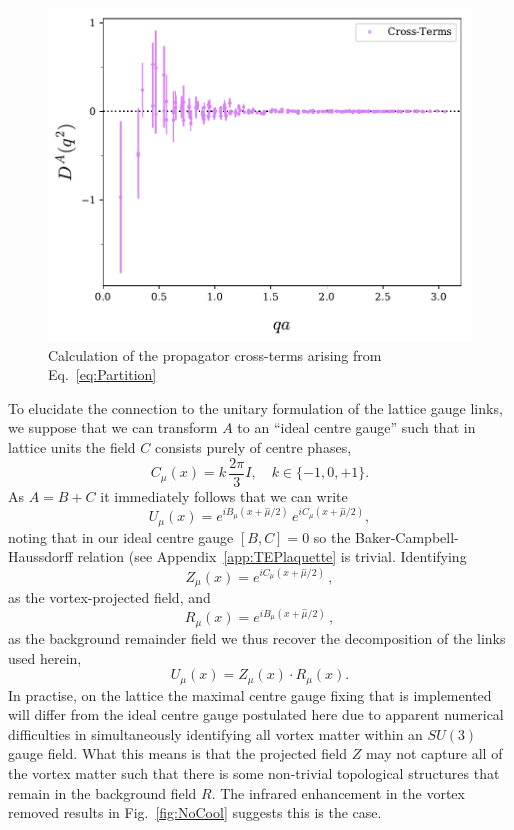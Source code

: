 \begin{figure}[htb!]
\centering
\includegraphics[width=\linewidth]{./ScalarGluComp_q2_CrossTerms.pdf}
\caption[Calculation of the propagator cross-terms]{\label{fig:CrossTerms} Calculation of the propagator cross-terms arising from Eq.~\eqref{eq:Partition}}
\end{figure} 
%

To elucidate the connection to the unitary formulation of the lattice gauge links, we suppose that we can transform $A$ to an ``ideal centre gauge'' such that in lattice units the field $C$ consists purely of centre phases,
%
\begin{equation}
C_\mu(x) = k\,\frac{2\pi}{3} I,\quad k\in \{-1,0,+1\}.
\end{equation}
%
As $A = B + C$ it immediately follows that we can write
\begin{equation}
U_{\mu}(x) = e^{i B_{\mu}(x+\hat{\mu}/2)} \, e^{i C_{\mu}(x+\hat{\mu}/2)},
\end{equation}
noting that in our ideal centre gauge $[B,C] = 0$ so the Baker-Campbell-Haussdorff relation (see Appendix~\ref{app:TEPlaquette} is trivial. Identifying
\begin{equation}
Z_{\mu}(x) = e^{i C_{\mu}(x+\hat{\mu}/2)}\, ,
\end{equation}
as the vortex-projected field, and
\begin{equation}
R_{\mu}(x) = e^{i B_{\mu}(x+\hat{\mu}/2)}\, ,
\end{equation}
as the background remainder field we thus recover the decomposition of the links used herein,
\begin{equation}
U_{\mu}(x) = Z_{\mu}(x)\cdot R_{\mu}(x).
\end{equation}
In practise, on the lattice the maximal centre gauge fixing that is implemented will differ from the ideal centre gauge postulated here due to apparent numerical difficulties in simultaneously identifying all vortex matter within an $SU(3)$ gauge field. What this means is that the projected field $Z$ may not capture all of the vortex matter such that there is some non-trivial topological structures that remain in the background field $R.$ The infrared enhancement in the vortex removed results in Fig.~\ref{fig:NoCool} suggests this is the case.\\

